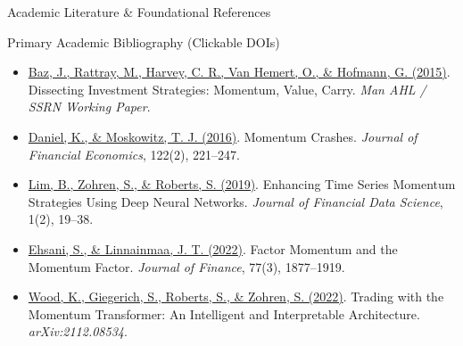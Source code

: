 \documentclass[10pt]{beamer}
\begin{document}
\begin{frame}{Academic Literature \& Foundational References}
\begin{block}{\tiny Primary Academic Bibliography (Clickable DOIs)}
\begin{itemize}
      \item \href{https://ssrn.com/abstract=2695101}{Baz, J., Rattray, M., Harvey, C. R., Van Hemert, O., \& Hofmann, G. (2015)}. Dissecting Investment Strategies: Momentum, Value, Carry. \emph{Man AHL / SSRN Working Paper}.
      \item \href{https://www.nber.org/papers/w20439}{Daniel, K., \& Moskowitz, T. J. (2016)}. Momentum Crashes. \emph{Journal of Financial Economics}, 122(2), 221--247.
      \item \href{https://arxiv.org/abs/1904.04912}{Lim, B., Zohren, S., \& Roberts, S. (2019)}. Enhancing Time Series Momentum Strategies Using Deep Neural Networks. \emph{Journal of Financial Data Science}, 1(2), 19--38.
      \item \href{https://www.nber.org/papers/w25551}{Ehsani, S., \& Linnainmaa, J. T. (2022)}. Factor Momentum and the Momentum Factor. \emph{Journal of Finance}, 77(3), 1877--1919.
      \item \href{https://arxiv.org/abs/2112.08534}{Wood, K., Giegerich, S., Roberts, S., \& Zohren, S. (2022)}. Trading with the Momentum Transformer: An Intelligent and Interpretable Architecture. \emph{arXiv:2112.08534}.
    \end{itemize}
  \end{block}
\end{frame}
\end{document}
